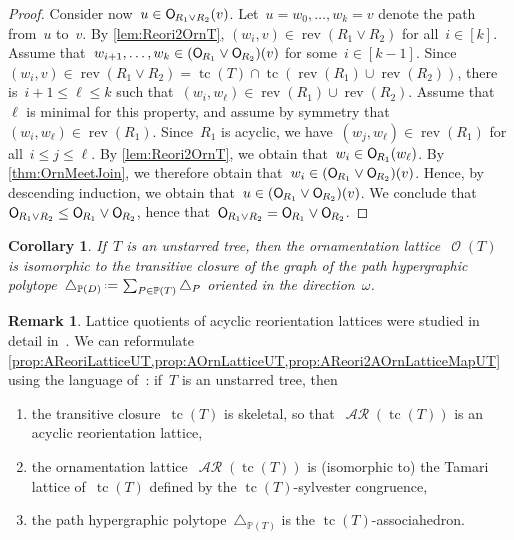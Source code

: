 \documentclass{amsart}
\newtheorem{corollary}[theorem]{Corollary}
\theoremstyle{definition}
\newtheorem{remark}[theorem]{Remark}
\renewcommand{\c}[1]{\mathcal{#1}} %
\newcommand{\eqdef}{\mbox{\,\raisebox{0.2ex}{\scriptsize\ensuremath{\mathrm:}}\ensuremath{=}\,}} %
\newcommand{\simplex}{\triangle} %
\DeclareMathOperator{\tc}{tc} %
\newcommand{\join}{\vee} %
\newcommand{\mymap}[2]{\mathsf{#1}_{\hspace{-.7pt}#2}}
\DeclareMathOperator{\Orn}{\c{O}}  %
\newcommand{\orn}[1]{\mymap{O}{#1}}  %
\DeclareMathOperator{\AReori}{\c{AR}}  %
\DeclareMathOperator{\rev}{rev} %
\newcommand{\PP}{\mathbb P} %
\begin{document}
\begin{proof}
Consider now~$u \in \orn{R_1 \join R_2}(v)$.
Let~$u = w_0, \dots, w_k = v$ denote the path from~$u$ to~$v$.
By \cref{lem:Reori2OrnT}, $(w_i, v) \in \rev(R_1 \join R_2)$ for all~$i \in [k]$.
Assume that~$w_{i+1}, \dots, w_k \in (\orn{R_1} \join \orn{R_2})(v)$ for some~$i \in [k-1]$.
Since~$(w_i, v) \in \rev(R_1 \join R_2) = \tc(T) \cap \tc(\rev(R_1) \cup \rev(R_2))$, there is~${i+1 \le \ell \le k}$ such that~$(w_i, w_\ell) \in \rev(R_1) \cup \rev(R_2)$.
Assume that~$\ell$ is minimal for this property, and assume by symmetry that~$(w_i, w_\ell) \in \rev(R_1)$.
Since~$R_1$ is acyclic, we have~$(w_j, w_\ell) \in \rev(R_1)$ for all~${i \le j \le \ell}$.
By \cref{lem:Reori2OrnT}, we obtain that~$w_i \in \orn{R_1}(w_\ell)$.
By \cref{thm:OrnMeetJoin}, we therefore obtain that~${w_i \in (\orn{R_1} \join \orn{R_2})(v)}$.
Hence, by descending induction, we obtain that~$u \in (\orn{R_1} \join \orn{R_2})(v)$.
We conclude that~$\orn{R_1 \join R_2} \le \orn{R_1} \join \orn{R_2}$, hence that~${\orn{R_1 \join R_2} = \orn{R_1} \join \orn{R_2}}$.
\end{proof}

\begin{corollary}
If~$T$ is an unstarred tree, then the ornamentation lattice~$\Orn(T)$ is isomorphic to the transitive closure of the graph of the path hypergraphic polytope~$\simplex_{\PP(D)} \eqdef \sum_{P \in \PP(T)} \simplex_P$ oriented in the direction~$\omega$.
\end{corollary}

\begin{remark}
Lattice quotients of acyclic reorientation lattices were studied in detail in~\cite{Pilaud-acyclicReorientationLattices}.
We can reformulate \cref{prop:AReoriLatticeUT,prop:AOrnLatticeUT,prop:AReori2AOrnLatticeMapUT} using the language of~\cite{Pilaud-acyclicReorientationLattices}: if~$T$ is an unstarred tree, then
\begin{enumerate}
\item the transitive closure~$\tc(T)$ is skeletal, so that~$\AReori(\tc(T))$ is an acyclic reorientation lattice,
\item the ornamentation lattice~$\AReori(\tc(T))$ is (isomorphic to) the Tamari lattice of~$\tc(T)$ defined by the $\tc(T)$-sylvester congruence,
\item the path hypergraphic polytope~$\simplex_{\PP(T)}$ is the $\tc(T)$-associahedron.
\end{enumerate}
\end{remark}
\end{document}
